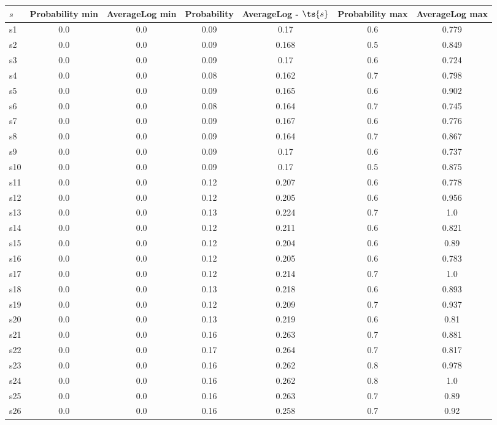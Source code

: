 \documentclass{article}
\begin{document}
\noindent\begin{tabular}{|l|c|c|c|c|c|c|}
\hline
$s$& Probability min & AverageLog min & Probability & AverageLog - $\ts{s}$ & Probability max & AverageLog max\\
\hline
s1 &0.0 & 0.0 & 0.09 & 0.17 & 0.6 & 0.779\\
\hline
s2 &0.0 & 0.0 & 0.09 & 0.168 & 0.5 & 0.849\\
\hline
s3 &0.0 & 0.0 & 0.09 & 0.17 & 0.6 & 0.724\\
\hline
s4 &0.0 & 0.0 & 0.08 & 0.162 & 0.7 & 0.798\\
\hline
s5 &0.0 & 0.0 & 0.09 & 0.165 & 0.6 & 0.902\\
\hline
s6 &0.0 & 0.0 & 0.08 & 0.164 & 0.7 & 0.745\\
\hline
s7 &0.0 & 0.0 & 0.09 & 0.167 & 0.6 & 0.776\\
\hline
s8 &0.0 & 0.0 & 0.09 & 0.164 & 0.7 & 0.867\\
\hline
s9 &0.0 & 0.0 & 0.09 & 0.17 & 0.6 & 0.737\\
\hline
s10 &0.0 & 0.0 & 0.09 & 0.17 & 0.5 & 0.875\\
\hline
s11 &0.0 & 0.0 & 0.12 & 0.207 & 0.6 & 0.778\\
\hline
s12 &0.0 & 0.0 & 0.12 & 0.205 & 0.6 & 0.956\\
\hline
s13 &0.0 & 0.0 & 0.13 & 0.224 & 0.7 & 1.0\\
\hline
s14 &0.0 & 0.0 & 0.12 & 0.211 & 0.6 & 0.821\\
\hline
s15 &0.0 & 0.0 & 0.12 & 0.204 & 0.6 & 0.89\\
\hline
s16 &0.0 & 0.0 & 0.12 & 0.205 & 0.6 & 0.783\\
\hline
s17 &0.0 & 0.0 & 0.12 & 0.214 & 0.7 & 1.0\\
\hline
s18 &0.0 & 0.0 & 0.13 & 0.218 & 0.6 & 0.893\\
\hline
s19 &0.0 & 0.0 & 0.12 & 0.209 & 0.7 & 0.937\\
\hline
s20 &0.0 & 0.0 & 0.13 & 0.219 & 0.6 & 0.81\\
\hline
s21 &0.0 & 0.0 & 0.16 & 0.263 & 0.7 & 0.881\\
\hline
s22 &0.0 & 0.0 & 0.17 & 0.264 & 0.7 & 0.817\\
\hline
s23 &0.0 & 0.0 & 0.16 & 0.262 & 0.8 & 0.978\\
\hline
s24 &0.0 & 0.0 & 0.16 & 0.262 & 0.8 & 1.0\\
\hline
s25 &0.0 & 0.0 & 0.16 & 0.263 & 0.7 & 0.89\\
\hline
s26 &0.0 & 0.0 & 0.16 & 0.258 & 0.7 & 0.92\\

\end{tabular}
\end{document}

